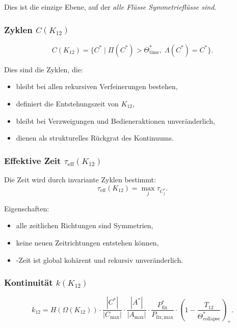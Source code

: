 Dies ist die einzige Ebene, auf der \emph{alle Flüsse Symmetrieflüsse sind}.

\subsubsection{Zyklen $C(K_{12})$}

\[
C(K_{12}) = \{ C^*\mid \Pi(C^*)>\Theta_{\mathrm{time}}^*,\;
\Lambda(C^*)=C^*\}.
\]

Dies sind die Zyklen, die:
\begin{itemize}
    \item bleibt bei allen rekursiven Verfeinerungen bestehen,
    \item definiert die Entstehungszeit von $K_{12}$,
    \item bleibt bei Verzweigungen und Bedieneraktionen unveränderlich,
    \item dienen als strukturelles Rückgrat des Kontinuums.
\end{itemize}

\subsubsection{Effektive Zeit $\tau_{\mathrm{eff}}(K_{12})$}

Die Zeit wird durch invariante Zyklen bestimmt:
\[
\tau_{\mathrm{eff}}(K_{12}) = \max_j \tau_{C_j^*}.
\]

Eigenschaften:
\begin{itemize}
    \item alle zeitlichen Richtungen sind Symmetrien,
    \item keine neuen Zeitrichtungen entstehen können,
    \item-Zeit ist global kohärent und rekursiv unveränderlich.
\end{itemize}

\subsubsection{Kontinuität $k(K_{12})$}

\[
k_{12} =
H(\Omega(K_{12}))
\cdot
\frac{|C^*|}{|C_{\max}|}
\cdot
\frac{|A^*|}{|A_{\max}|}
\cdot
\frac{P_{\mathrm{fix}}^*}{P_{\mathrm{fix,max}}}
\cdot
\left(1-\frac{T_{12}}{\Theta^*_{\mathrm{collapse}}}\right)_+.
\]

